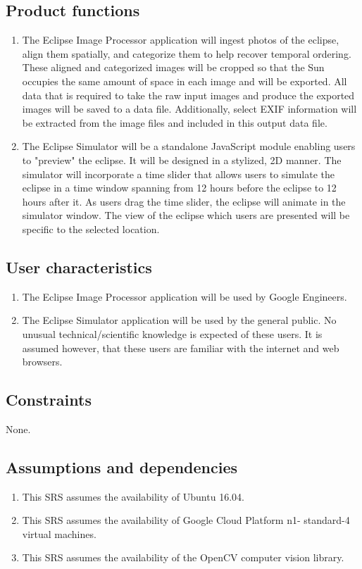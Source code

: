\documentclass[10pt, onecolumn, draftclsnofoot, letterpaper, compsoc]{IEEEtran}
\begin{document}
\subsection{Product functions}
	\begin{enumerate}
		\item The Eclipse Image Processor application will ingest 
			photos of the eclipse, align them spatially, and categorize
			them to help recover temporal ordering. These aligned and 
			categorized images will be cropped so that the Sun 
			occupies the same amount of space in each image and will be 
			exported. All data that is required to take the raw input 
			images and produce the exported images will be saved to a 
			data file. Additionally, select EXIF information will be 
			extracted from the image files and included in this output
			data file.
		\item The Eclipse Simulator will be a standalone JavaScript 
			module enabling users to "preview" the eclipse. It will be 
			designed in a stylized, 2D manner. The simulator will 
			incorporate a time slider that allows users to simulate the 
			eclipse in a time window spanning from 12 hours before the 
			eclipse to 12 hours after it. As users drag the time 
			slider, the eclipse will animate in the simulator window. 
			The view of the eclipse which users are presented will be 
			specific to the selected location.
	\end{enumerate}

\subsection{User characteristics}
	\begin{enumerate}
		\item The Eclipse Image Processor application will be used by 
			Google Engineers.

		\item The Eclipse Simulator application will be used by the
		general public. No unusual technical/scientific knowledge is
		expected of these users. It is assumed however, that these users
		are familiar with the internet and web browsers.
	\end{enumerate}

\subsection{Constraints}
None.

\subsection{Assumptions and dependencies}
	\begin{enumerate}
		\item This SRS assumes the availability of Ubuntu 16.04.
		\item This SRS assumes the availability of Google Cloud Platform n1-
		standard-4 virtual machines.
		\item This SRS assumes the availability of the OpenCV computer 
		vision library.
	\end{enumerate}
\end{document}
